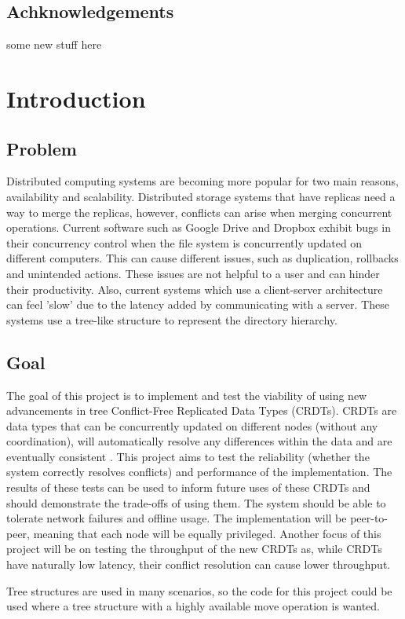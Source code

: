 \documentclass[12pt]{report}
\begin{document}
\section*{Achknowledgements}

some new stuff here



\newpage
\tableofcontents

\newpage

\setcounter{page}{1}

\chapter{Introduction}

\section{Problem}
Distributed computing systems are becoming more popular for two main reasons, availability and scalability. Distributed storage systems that have replicas need a way to merge the replicas, however, conflicts can arise when merging concurrent operations. Current software such as Google Drive and Dropbox exhibit bugs in their concurrency control when the file system is concurrently updated on different computers. This can cause different issues, such as duplication, rollbacks and unintended actions. These issues are not helpful to a user and can hinder their productivity. Also, current systems which use a client-server architecture can feel 'slow' due to the latency added by communicating with a server. These systems use a tree-like structure to represent the directory hierarchy.

\section{Goal}
The goal of this project is to implement and test the viability of using new advancements in tree Conflict-Free Replicated Data Types (CRDTs). CRDTs are data types that can be concurrently updated on different nodes (without any coordination), will automatically resolve any differences within the data and are eventually consistent \cite{10.1007/978-3-642-24550-3_29}.  This project aims to test the reliability (whether the system correctly resolves conflicts) and performance of the implementation. The results of these tests can be used to inform future uses of these CRDTs and should demonstrate the trade-offs of using them. The system should be able to tolerate network failures and offline usage. The implementation will be peer-to-peer, meaning that each node will be equally privileged. Another focus of this project will be on testing the throughput of the new CRDTs as, while CRDTs have naturally low latency, their conflict resolution can cause lower throughput. \par
Tree structures are used in many scenarios, so the code for this project could be used where a tree structure with a highly available move operation is wanted.
\end{document}
